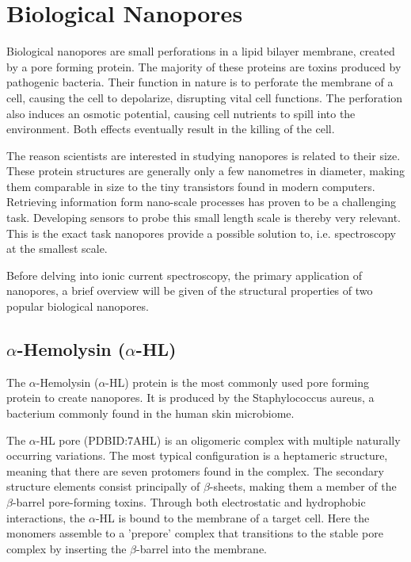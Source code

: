 \section{Biological Nanopores}

Biological nanopores are small perforations in a lipid bilayer membrane, created
by a pore forming protein.  The majority of these proteins are toxins produced by
pathogenic bacteria. Their function in nature is to perforate the membrane of a cell,
causing the cell to depolarize, disrupting vital cell functions. The perforation also
induces an osmotic potential, causing cell nutrients to spill into the environment. Both
effects eventually result in the killing of the cell.\cite{Peraro2016}

The reason scientists are interested in studying nanopores is related to their size.
These protein structures are generally only a few nanometres in diameter, making them
comparable in size to the tiny transistors found in modern computers. Retrieving
information form nano-scale processes has proven to be a challenging task. Developing
sensors to probe this small length scale is thereby very relevant. This is the exact task
nanopores provide a possible solution to, i.e. spectroscopy at the smallest
scale.

Before delving into ionic current spectroscopy, the primary application of nanopores, a
brief overview will be given of the structural properties of two popular biological
nanopores.

\subsection{$\alpha$-Hemolysin ($\alpha$-HL)}

The $\alpha$-Hemolysin ($\alpha$-HL) protein is the most commonly used pore forming
protein to create nanopores. It is produced by the Staphylococcus aureus, a
bacterium commonly found in the human skin microbiome. \cite{Bhakdi1991}

The $\alpha$-HL pore (PDBID:7AHL\cite{Song1859}) is an oligomeric complex with multiple
naturally occurring variations. The most typical configuration
is a heptameric structure, meaning that there are seven protomers found in the complex.
The secondary structure elements consist principally of $\beta$-sheets, making them a
member of the $\beta$-barrel pore-forming toxins. Through both electrostatic and
hydrophobic interactions, the $\alpha$-HL is bound to the membrane of a target cell. Here
the monomers assemble to a 'prepore' complex that transitions to the stable pore complex
by inserting the $\beta$-barrel into the membrane.\cite{SUGAWARA2015226}

